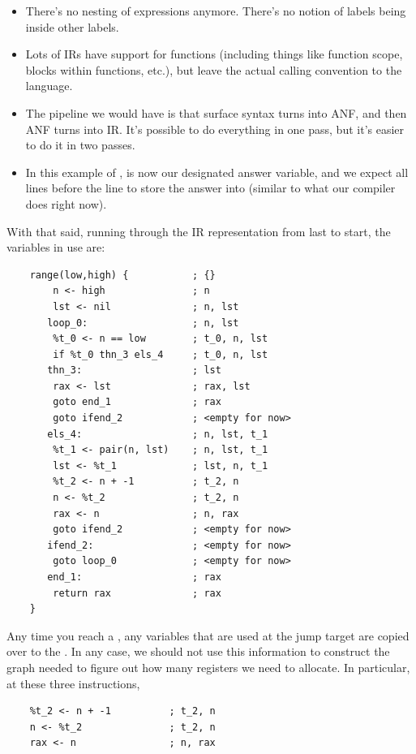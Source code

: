 \documentclass[letterpaper]{article}
\begin{document}
\begin{itemize}
    \item There's no nesting of expressions anymore. There's no notion of labels being inside other labels. 
    \item Lots of IRs have support for functions (including things like function scope, blocks within functions, etc.), but leave the actual calling convention to the language. 
    \item The pipeline we would have is that surface syntax turns into ANF, and then ANF turns into IR. It's possible to do everything in one pass, but it's easier to do it in two passes.
    \item In this example of ,  is now our designated answer variable, and we expect all lines before the  line to store the answer into  (similar to what our compiler does right now).
\end{itemize}
With that said, running through the IR representation from last to start, the variables in use are: 
\begin{verbatim}
    range(low,high) {           ; {}
        n <- high               ; n
        lst <- nil              ; n, lst 
       loop_0:                  ; n, lst
        %t_0 <- n == low        ; t_0, n, lst 
        if %t_0 thn_3 els_4     ; t_0, n, lst  
       thn_3:                   ; lst 
        rax <- lst              ; rax, lst 
        goto end_1              ; rax 
        goto ifend_2            ; <empty for now>
       els_4:                   ; n, lst, t_1
        %t_1 <- pair(n, lst)    ; n, lst, t_1
        lst <- %t_1             ; lst, n, t_1
        %t_2 <- n + -1          ; t_2, n 
        n <- %t_2               ; t_2, n 
        rax <- n                ; n, rax 
        goto ifend_2            ; <empty for now>
       ifend_2:                 ; <empty for now>
        goto loop_0             ; <empty for now>
       end_1:                   ; rax 
        return rax              ; rax
    }\end{verbatim}
Any time you reach a , any variables that are used at the jump target are copied over to the . In any case, we should not use this information to construct the graph needed to figure out how many registers we need to allocate. In particular, at these three instructions,
\begin{verbatim}
    %t_2 <- n + -1          ; t_2, n 
    n <- %t_2               ; t_2, n 
    rax <- n                ; n, rax \end{verbatim}
\end{document}
